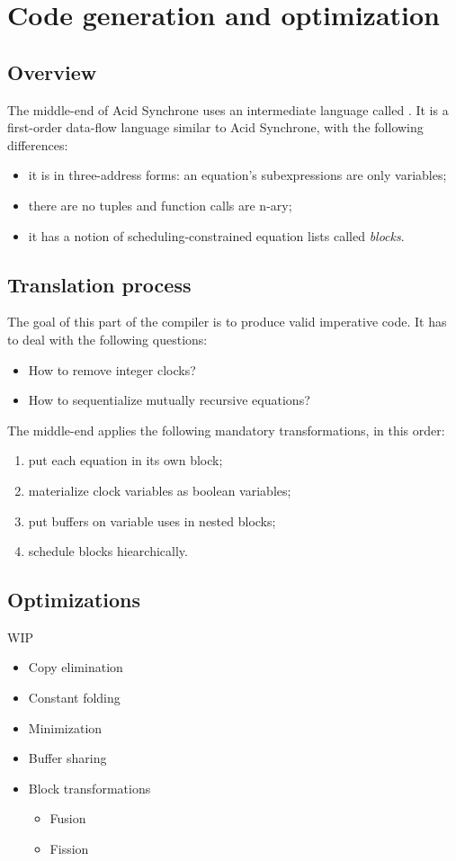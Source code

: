 \chapter{Code generation and optimization}

\section{Overview}

The middle-end of Acid Synchrone uses an intermediate language called \nir{}. It
is a first-order data-flow language similar to Acid Synchrone, with the
following differences:
\begin{itemize}
\item it is in three-address forms: an equation's subexpressions are only
  variables;
\item there are no tuples and function calls are n-ary;
\item it has a notion of scheduling-constrained equation lists called \textit{blocks}.
\end{itemize}

\section{Translation process}

The goal of this part of the compiler is to produce valid imperative code. It
has to deal with the following questions:
\begin{itemize}
\item How to remove integer clocks?
\item How to sequentialize mutually recursive equations?
\end{itemize}

The middle-end applies the following mandatory transformations, in this order:
\begin{enumerate}
\item put each equation in its own block;
\item materialize clock variables as boolean variables;
\item put buffers on variable uses in nested blocks;
\item schedule blocks hiearchically.
\end{enumerate}

\section{Optimizations}

WIP

\begin{itemize}
\item Copy elimination
\item Constant folding
\item Minimization
\item Buffer sharing
\item Block transformations
  \begin{itemize}
  \item Fusion
  \item Fission
  \end{itemize}
\end{itemize}